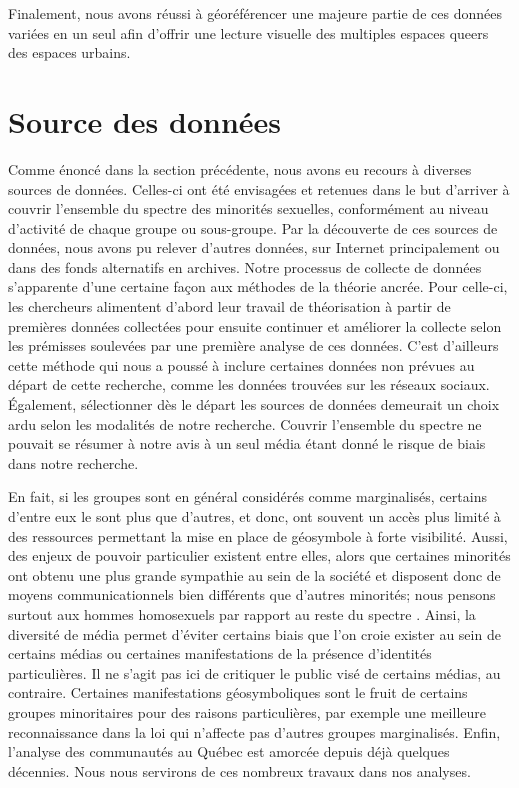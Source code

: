 Finalement, nous avons réussi à géoréférencer une majeure partie de ces données variées en un seul \sig{} afin d'offrir une lecture visuelle des multiples espaces queers des espaces urbains.

\section{Source des données}
\label{sec:source_des_donn_es}

Comme énoncé dans la section précédente, nous avons eu recours à diverses sources de données.
Celles-ci ont été envisagées et retenues dans le but d'arriver à couvrir l'ensemble du spectre des minorités sexuelles, conformément au niveau d'activité de chaque groupe ou sous-groupe.
Par la découverte de ces sources de données, nous avons pu relever d'autres données, sur Internet principalement ou dans des fonds alternatifs en archives.
Notre processus de collecte de données s'apparente d'une certaine façon aux méthodes de la théorie ancrée.
Pour celle-ci, les chercheurs alimentent d'abord leur travail de théorisation à partir de premières données collectées pour ensuite continuer et améliorer la collecte selon les prémisses soulevées par une première analyse de ces données.
C'est d'ailleurs cette méthode qui nous a poussé à inclure certaines données non prévues au départ de cette recherche, comme les données trouvées sur les réseaux sociaux.
Également, sélectionner dès le départ les sources de données demeurait un choix ardu selon les modalités de notre recherche.
Couvrir l'ensemble du spectre \lgbt{} ne pouvait se résumer à notre avis à un seul média étant donné le risque de biais dans notre recherche.

En fait, si les groupes \lgbt{} sont en général considérés comme marginalisés, certains d'entre eux le sont plus que d'autres, et donc, ont souvent un accès plus limité à des ressources permettant la mise en place de géosymbole à forte visibilité.
Aussi, des enjeux de pouvoir particulier existent entre elles, alors que certaines minorités ont obtenu une plus grande sympathie au sein de la société et disposent donc de moyens communicationnels bien différents que d'autres minorités; nous pensons surtout aux hommes homosexuels par rapport au reste du spectre \lgbt{}.
Ainsi, la diversité de média permet d'éviter certains biais que l'on croie exister au sein de certains médias ou certaines manifestations de la présence d'identités particulières.
Il ne s'agit pas ici de critiquer le public visé de certains médias, au contraire.
Certaines manifestations géosymboliques sont le fruit de certains groupes minoritaires pour des raisons particulières, par exemple une meilleure reconnaissance dans la loi qui n'affecte pas d'autres groupes marginalisés.
Enfin, l'analyse des communautés \lgbt{} au Québec est amorcée depuis déjà quelques décennies.
Nous nous servirons de ces nombreux travaux dans nos analyses.

